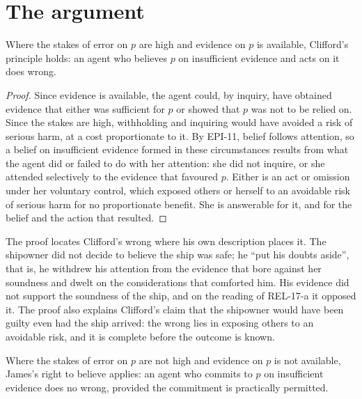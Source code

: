 \documentclass{situationist-preprint}
\begin{document}
\section{The argument}

\begin{theorem}\label{t:clifford}
Where the stakes of error on $p$ are high and evidence on $p$ is available, Clifford's principle holds: an agent who believes $p$ on insufficient evidence and acts on it does wrong.
\end{theorem}

\begin{proof}
Since evidence is available, the agent could, by inquiry, have obtained evidence that either was sufficient for $p$ or showed that $p$ was not to be relied on. Since the stakes are high, withholding and inquiring would have avoided a risk of serious harm, at a cost proportionate to it. By EPI-11, belief follows attention, so a belief on insufficient evidence formed in these circumstances results from what the agent did or failed to do with her attention: she did not inquire, or she attended selectively to the evidence that favoured $p$. Either is an act or omission under her voluntary control, which exposed others or herself to an avoidable risk of serious harm for no proportionate benefit. She is answerable for it, and for the belief and the action that resulted.
\end{proof}

The proof locates Clifford's wrong where his own description places it. The shipowner did not decide to believe the ship was safe; he \enquote{put his doubts aside}, that is, he withdrew his attention from the evidence that bore against her soundness and dwelt on the considerations that comforted him. His evidence did not support the soundness of the ship, and on the reading of REL-17-a it opposed it. The proof also explains Clifford's claim that the shipowner would have been guilty even had the ship arrived: the wrong lies in exposing others to an avoidable risk, and it is complete before the outcome is known.

\begin{theorem}\label{t:james}
Where the stakes of error on $p$ are not high and evidence on $p$ is not available, James's right to believe applies: an agent who commits to $p$ on insufficient evidence does no wrong, provided the commitment is practically permitted.
\end{theorem}
\end{document}
